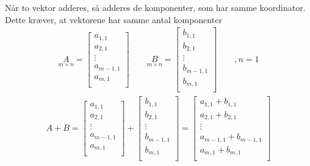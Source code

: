 \begin{defn}
Når to vektor adderes, så adderes de komponenter, som har samme koordinator. Dette kræver, at vektorene har samme antal komponenter
\begin{align*}
\underset{m \times n}{A} = 
\begin{bmatrix}
a_{1,1}\\
a_{2,1}\\
\vdots \\
a_{m-1,1}\\
a_{m,1} \\
\end{bmatrix}
\qquad
\underset{m \times n}{B} = 
\begin{bmatrix}
b_{1,1}\\
b_{2,1}\\
\vdots \\
b_{m-1,1}\\
b_{m,1} \\
\end{bmatrix}
\qquad , n=1
\end{align*} 
\begin{align*}
A+B=
\begin{bmatrix}
a_{1,1}\\
a_{2,1}\\
\vdots \\
a_{m-1,1}\\
a_{m,1} \\
\end{bmatrix}
+
\begin{bmatrix}
b_{1,1}\\
b_{2,1}\\
\vdots \\
b_{m-1,1}\\
b_{m,1} \\
\end{bmatrix}
=
\begin{bmatrix}
a_{1,1}+b_{1,1}\\
a_{2,1}+b_{2,1}\\
\vdots \\
a_{m-1,1}+b_{m-1,1}\\
a_{m,1}+b_{m,1} \\
\end{bmatrix}
\end{align*}
\end{defn}
